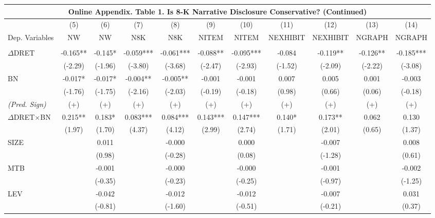 \begin{table}
	\begin{center}
		\tabcolsep=0.11cm
		\begin{tabular}{lcccccccccc}
			\multicolumn{11}{c}{\textbf{Online Appendix. Table 1. Is 8-K Narrative Disclosure Conservative? (Continued)}} \\
			\toprule
			\toprule
			 & (5) & (6) & (7) & (8) & (9) & (10) & (11) & (12) & (13) & (14) \\
			Dep. Variables & NW & NW & N8K & N8K & NITEM & NITEM & NEXHIBIT & NEXHIBIT & NGRAPH & NGRAPH \\
			\midrule
			&   &   &   &   &   &  &   &   &   &  \\
			$\Delta$DRET & -0.165** & -0.145* & -0.059*** & -0.061*** & -0.088** & -0.095*** & -0.084 & -0.119** & -0.126** & -0.185*** \\
			& (-2.29) & (-1.96) & (-3.80) & (-3.68) & (-2.47) & (-2.93) & (-1.52) & (-2.09) & (-2.22) & (-3.08) \\
			BN & -0.017* & -0.017* & -0.004** & -0.005** & -0.001 & -0.001 & 0.007 & 0.005 & 0.001 & -0.003 \\
		    & (-1.76) & (-1.75) & (-2.16) & (-2.03) & (-0.19) & (-0.18) & (0.98) & (0.66) & (0.06) & (-0.18) \\
			\rowcolor[rgb]{ .906,  .902,  .902} \textit{(Pred. Sign)} & (+) & (+) & (+) & (+) & (+) & (+) & (+) & (+) & (+) & (+) \\
			\rowcolor[rgb]{ .906,  .902,  .902} $\Delta$DRET$\times$BN & 0.215** & 0.183* & 0.083*** & 0.084*** & 0.143*** & 0.147*** & 0.140* & 0.173** & 0.062 & 0.130 \\
			\rowcolor[rgb]{ .906,  .902,  .902} & (1.97) & (1.70) & (4.37) & (4.12) & (2.99) & (2.74) & (1.71) & (2.01) & (0.65) & (1.37) \\
			SIZE &   & 0.011 &   & -0.000 &   & 0.000 &   & -0.007 &   & 0.008 \\
			&   & (0.98) &   & (-0.28) &   & (0.08) &   & (-1.28) &   & (0.61) \\
			MTB &   & -0.001 &   & -0.000 &   & -0.000 &   & -0.001 &   & -0.002 \\
			&   & (-0.35) &   & (-0.23) &   & (-0.25) &   & (-0.97) &   & (-1.25) \\
			LEV &   & -0.042 &   & -0.012 &   & -0.012 &   & -0.007 &   & 0.031 \\
			&   & (-0.81) &   & (-1.60) &   & (-0.51) &   & (-0.21) &   & (0.37) \\

\end{tabular}
\end{center}
\end{table}
